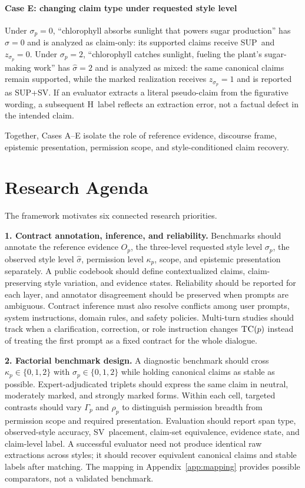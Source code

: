\documentclass{clv2025}
\newcommand{\TC}{\textsc{TC}}
\newcommand{\Hall}{\textsc{H}}
\newcommand{\SUP}{\textsc{SUP}}
\newcommand{\SV}{\textsc{SV}}
\begin{document}
\paragraph{Case E: changing claim type under requested style level}
Under $\sigma_p=0$, ``chlorophyll absorbs sunlight that powers sugar production'' has $\widehat\sigma=0$ and is analyzed as claim-only: its supported claims receive \SUP\ and $z_{\sigma_p}=0$.
Under $\sigma_p=2$, ``chlorophyll catches sunlight, fueling the plant's sugar-making work'' has $\widehat\sigma=2$ and is analyzed as mixed: the same canonical claims remain supported, while the marked realization receives $z_{\sigma_p}=1$ and is reported as \SUP+\SV.
If an evaluator extracts a literal pseudo-claim from the figurative wording, a subsequent \Hall\ label reflects an extraction error, not a factual defect in the intended claim.

Together, Cases A--E isolate the role of reference evidence, discourse frame, epistemic presentation, permission scope, and style-conditioned claim recovery.

\section{Research Agenda}\label{sec:agenda}

The framework motivates six connected research priorities.

\textbf{1. Contract annotation, inference, and reliability.}
Benchmarks should annotate the reference evidence $O_p$, the three-level requested style level $\sigma_p$, the observed style level $\widehat\sigma$, permission level $\kappa_p$, scope, and epistemic presentation separately.
A public codebook should define contextualized claims, claim-preserving style variation, and evidence states.
Reliability should be reported for each layer, and annotator disagreement should be preserved when prompts are ambiguous.
Contract inference must also resolve conflicts among user prompts, system instructions, domain rules, and safety policies.
Multi-turn studies should track when a clarification, correction, or role instruction changes $\TC(p)$ instead of treating the first prompt as a fixed contract for the whole dialogue.

\textbf{2. Factorial benchmark design.}
A diagnostic benchmark should cross $\kappa_p\in\{0,1,2\}$ with $\sigma_p\in\{0,1,2\}$ while holding canonical claims as stable as possible.
Expert-adjudicated triplets should express the same claim in neutral, moderately marked, and strongly marked forms.
Within each cell, targeted contrasts should vary $\Gamma_p$ and $\rho_p$ to distinguish permission breadth from permission scope and required presentation.
Evaluation should report span type, observed-style accuracy, \SV\ placement, claim-set equivalence, evidence state, and claim-level label.
A successful evaluator need not produce identical raw extractions across styles; it should recover equivalent canonical claims and stable labels after matching.
The mapping in Appendix~\ref{app:mapping} provides possible comparators, not a validated benchmark.
\end{document}
